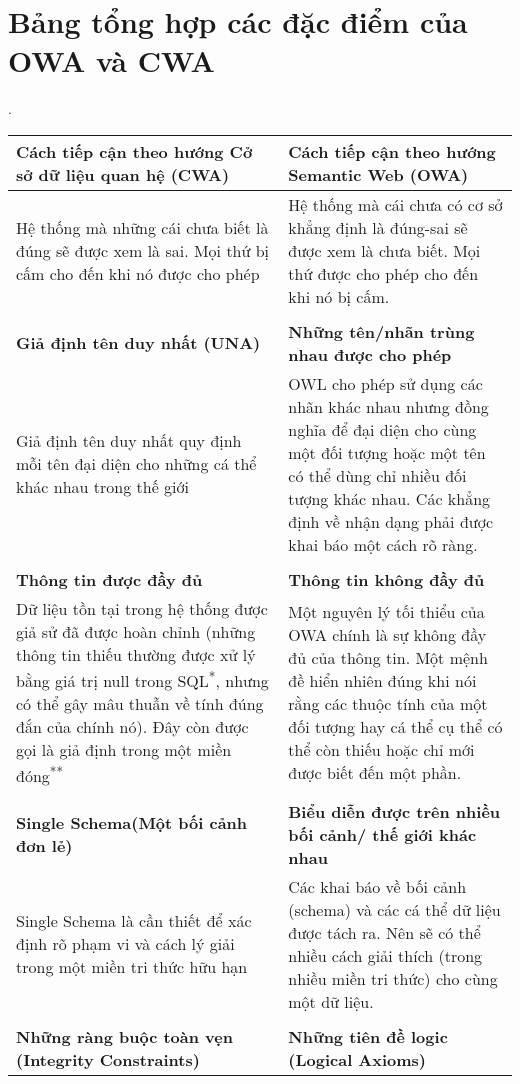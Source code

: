 \section{Bảng tổng hợp các đặc điểm của OWA và CWA \cite{OWA_CWA}} \cite{ianhorrock1}.
\begin{longtable}{ p{7cm} p{7cm} }
\textbf{Cách tiếp cận theo hướng Cở sở dữ liệu quan hệ (CWA)} &\textbf{ Cách tiếp cận theo hướng Semantic Web (OWA)}\\
\hline
Hệ thống mà những cái chưa biết là đúng sẽ được xem là sai. Mọi thứ bị cấm cho đến khi nó được cho phép & Hệ thống mà cái chưa có cơ sở khẳng định là đúng-sai sẽ được xem là chưa biết. Mọi thứ được cho phép cho đến khi nó bị cấm.
\\
&
\\
\textbf{Giả định tên duy nhất (UNA)} & \textbf{Những tên/nhãn trùng nhau được cho phép}
\\
Giả định tên duy nhất quy định mỗi tên đại diện cho những cá thể khác nhau trong thế giới & OWL cho phép sử dụng các nhãn khác nhau nhưng đồng nghĩa để đại diện cho cùng một đối tượng hoặc một tên có thể dùng chỉ nhiều đối tượng khác nhau. Các khẳng định về nhận dạng phải được khai báo một cách rõ ràng.
\\
&
\\
\textbf{Thông tin được đầy đủ} & \textbf{Thông tin không đầy đủ}
\\
Dữ liệu tồn tại trong hệ thống được giả sử đã được hoàn chỉnh (những thông tin thiếu thường được xử lý bằng giá trị null trong SQL\textsuperscript{*}, nhưng có thể gây mâu thuẫn về tính đúng đắn của chính nó). Đây còn được gọi là giả định trong một miền đóng\textsuperscript{**} & Một nguyên lý tối thiểu của OWA chính là sự không đầy đủ của thông tin. Một mệnh đề hiển nhiên đúng khi nói rằng các thuộc tính của một đối tượng hay cá thể cụ thể có thể còn thiếu hoặc chỉ mới được biết đến một phần.
\\
&
\\
\textbf{Single Schema(Một bối cảnh đơn lẻ)} & \textbf{Biểu diễn được trên nhiều bối cảnh/ thế giới khác nhau}
\\
Single Schema là cần thiết để xác định rõ phạm vi và cách lý giải trong một miền tri thức hữu hạn & Các khai báo về bối cảnh (schema) và các cá thể dữ liệu được tách ra. Nên sẽ có thể nhiều cách giải thích (trong nhiều miền tri thức) cho cùng một dữ liệu.
\\
&
\\
\textbf{Những ràng buộc toàn vẹn (Integrity Constraints)}
&
\textbf{Những tiên đề logic (Logical Axioms)}

\end{longtable}
